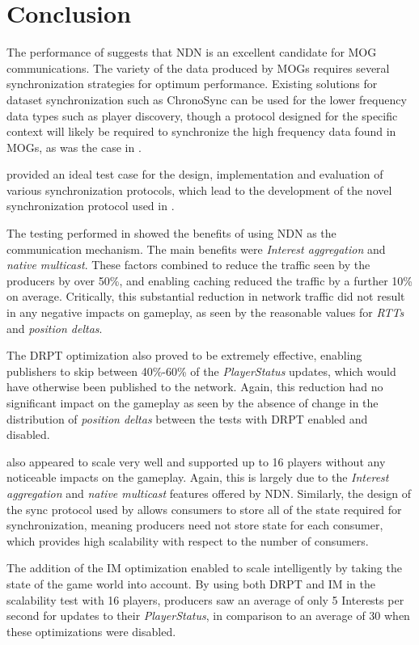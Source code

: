\chapter{Conclusion}
The performance of \game{} suggests that NDN is an excellent candidate for MOG communications. The variety of the data produced by MOGs requires several synchronization strategies for optimum performance. Existing solutions for dataset synchronization such as ChronoSync can be used for the lower frequency data types such as player discovery, though a protocol designed for the specific context will likely be required to synchronize the high frequency data found in MOGs, as was the case in \game{}. 

\game{} provided an ideal test case for the design, implementation and evaluation of various synchronization protocols, which lead to the development of the novel synchronization protocol used in \game{}.

The testing performed in  showed the benefits of using NDN as the communication mechanism. The main benefits were \textit{Interest aggregation} and \textit{native multicast}. These factors combined to reduce the traffic seen by the producers by over 50\%, and enabling caching reduced the traffic by a further 10\% on average. Critically, this substantial reduction in network traffic did not result in any negative impacts on gameplay, as seen by the reasonable values for \textit{RTTs} and \textit{position deltas}.

The DRPT optimization also proved to be extremely effective, enabling publishers to skip between 40\%-60\% of the \textit{PlayerStatus} updates, which would have otherwise been published to the network. Again, this reduction had no significant impact on the gameplay as seen by the absence of change in the distribution of \textit{position deltas} between the tests with DRPT enabled and disabled. 

\game{} also appeared to scale very well and supported up to 16 players without any noticeable impacts on the gameplay. Again, this is largely due to the \textit{Interest aggregation} and \textit{native multicast} features offered by NDN. Similarly, the design of the sync protocol used by \game{} allows consumers to store all of the state required for synchronization, meaning producers need not store state for each consumer, which provides high scalability with respect to the number of consumers. 

The addition of the IM optimization enabled \game{} to scale intelligently by taking the state of the game world into account. By using both DRPT and IM in the scalability test with 16 players, producers saw an average of only 5 Interests per second for updates to their \textit{PlayerStatus}, in comparison to an average of 30 when these optimizations were disabled. 


